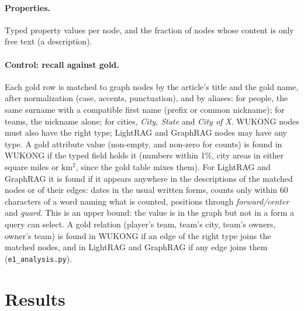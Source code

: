 \documentclass[11pt]{article}
\newcommand{\code}[1]{\texttt{#1}}
\newcommand{\wk}{WUKONG}
\begin{document}
\paragraph{Properties.} Typed property values per node, and the fraction of nodes whose content is
only free text (a description).

\paragraph{Control: recall against gold.} Each gold row is matched to graph nodes by the
article's title and the gold name, after normalization (case, accents, punctuation), and by
aliases: for people, the same surname with a compatible first name (prefix or common nickname);
for teams, the nickname alone; for cities, \emph{City, State} and \emph{City of X}. \wk{} nodes
must also have the right type; LightRAG and GraphRAG nodes may have any type. A gold attribute
value (non-empty, and non-zero for counts) is found in \wk{} if the typed field holds it (numbers
within 1\%, city areas in either square miles or km$^2$, since the gold table mixes them). For
LightRAG and GraphRAG it is found if it appears anywhere in the descriptions of the matched nodes
or of their edges: dates in the usual written forms, counts only within 60 characters of a word
naming what is counted, positions through \emph{forward/center} and \emph{guard}. This is an upper
bound: the value is in the graph but not in a form a query can select. A gold relation (player's
team, team's city, team's owners, owner's team) is found in \wk{} if an edge of the right type
joins the matched nodes, and in LightRAG and GraphRAG if any edge joins them
(\code{e1\_analysis.py}).

\section{Results}
\end{document}
